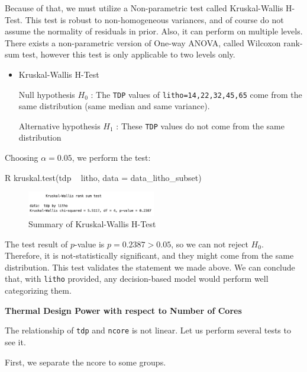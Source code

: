 Because of that, we must utilize a Non-parametric test called Kruskal-Wallis H-Test. This test is robust to non-homogeneous variances, and of course
do not assume the normality of residuals in prior. Also, it can perform on multiple levels. There exists a non-parametric version of One-way ANOVA, 
called Wilcoxon rank-sum test, however this test is only applicable to two levels only.
\begin{itemize}
    \item Kruskal-Wallis H-Test
    
    \qquad Null hypothesis $H_0$ : The \verb|TDP| values of \verb|litho=14,22,32,45,65| come from the same distribution (same median and same variance).

    \qquad Alternative hypothesis $H_1$ : These \verb|TDP| values do not come from the same distribution
\end{itemize}

Choosing $\alpha = 0.05$, we perform the test:
\begin{code}{R}
    kruskal.test(tdp ~ litho, data = data_litho_subset)    
\end{code}

\begin{figure}[H]
    \centering
    \includegraphics[width=0.5\textwidth]{./graphics/anova_litho_kruskal.png}
    \caption{Summary of Kruskal-Wallis H-Test}
    \label{fig:anova_litho_kruskal}
\end{figure}

The test result of $p$-value is $p = 0.2387 > 0.05$, so we can not reject $H_0$. Therefore, it is not-statistically significant, and they might come
from the same distribution. This test validates the statement we made above. We can conclude that, with \verb|litho| provided, any decision-based model
would perform well categorizing them.









\textbf{Thermal Design Power with respect to Number of Cores}

The relationship of \verb|tdp| and \verb|ncore| is not linear. Let us perform several tests to see it.
    
First, we separate the ncore to some groups.
    
